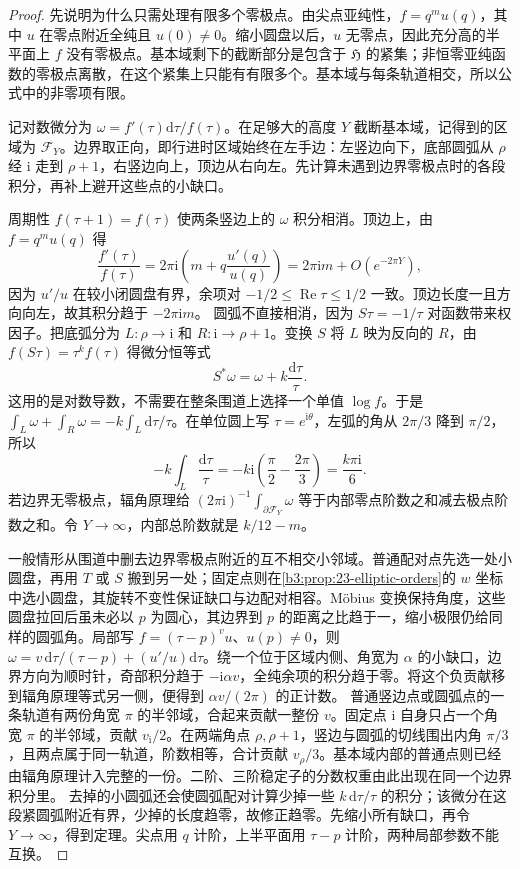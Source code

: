 \begin{proof}
先说明为什么只需处理有限多个零极点。由尖点亚纯性，\(f=q^m u(q)\)，其中 \(u\) 在零点附近全纯且 \(u(0)\ne0\)。缩小圆盘以后，\(u\) 无零点，因此充分高的半平面上 \(f\) 没有零极点。基本域剩下的截断部分是包含于 \(\mathfrak H\) 的紧集；非恒零亚纯函数的零极点离散，在这个紧集上只能有有限多个。基本域与每条轨道相交，所以公式中的非零项有限。

记对数微分为 \(\omega=f'(\tau)\mathrm{d}\tau/f(\tau)\)。在足够大的高度 \(Y\) 截断基本域，记得到的区域为 \(\mathcal F_Y\)。边界取正向，即行进时区域始终在左手边：左竖边向下，底部圆弧从 \(\rho\) 经 \(\mathrm{i}\) 走到 \(\rho+1\)，右竖边向上，顶边从右向左。先计算未遇到边界零极点时的各段积分，再补上避开这些点的小缺口。

周期性 \(f(\tau+1)=f(\tau)\) 使两条竖边上的 \(\omega\) 积分相消。顶边上，由 \(f=q^m u(q)\) 得
\[
 \frac{f'(\tau)}{f(\tau)}
 =2\pi\mathrm{i}\left(m+q\frac{u'(q)}{u(q)}\right)
 =2\pi\mathrm{i}m+O(e^{-2\pi Y}),
\]
因为 \(u'/u\) 在较小闭圆盘有界，余项对 \(-1/2\le\operatorname{Re}\tau\le1/2\) 一致。顶边长度一且方向向左，故其积分趋于 \(-2\pi\mathrm{i}m\)。
圆弧不直接相消，因为 \(S\tau=-1/\tau\) 对函数带来权因子。把底弧分为 \(L:\rho\to\mathrm{i}\) 和 \(R:\mathrm{i}\to\rho+1\)。变换 \(S\) 将 \(L\) 映为反向的 \(R\)，由 \(f(S\tau)=\tau^kf(\tau)\) 得微分恒等式
\[
 S^*\omega=\omega+k\frac{\mathrm{d}\tau}{\tau}.
\]
这用的是对数导数，不需要在整条围道上选择一个单值 \(\log f\)。于是
\(\int_L\omega+\int_R\omega=-k\int_L\mathrm{d}\tau/\tau\)。在单位圆上写 \(\tau=e^{\mathrm{i}\theta}\)，左弧的角从 \(2\pi/3\) 降到 \(\pi/2\)，所以
\[
 -k\int_L\frac{\mathrm{d}\tau}{\tau}
 =-k\mathrm{i}\left(\frac\pi2-\frac{2\pi}3\right)
 =\frac{k\pi\mathrm{i}}6.
\]
若边界无零极点，辐角原理给 \((2\pi\mathrm{i})^{-1}\int_{\partial\mathcal F_Y}\omega\) 等于内部零点阶数之和减去极点阶数之和。令 \(Y\to\infty\)，内部总阶数就是 \(k/12-m\)。

一般情形从围道中删去边界零极点附近的互不相交小邻域。普通配对点先选一处小圆盘，再用 \(T\) 或 \(S\) 搬到另一处；固定点则在\cref{b3:prop:23-elliptic-orders}的 \(w\) 坐标中选小圆盘，其旋转不变性保证缺口与边配对相容。Möbius 变换保持角度，这些圆盘拉回后虽未必以 \(p\) 为圆心，其边界到 \(p\) 的距离之比趋于一，缩小极限仍给同样的圆弧角。局部写 \(f=(\tau-p)^v u\)、\(u(p)\ne0\)，则
\(\omega=v\,\mathrm{d}\tau/(\tau-p)+(u'/u)\mathrm{d}\tau\)。绕一个位于区域内侧、角宽为 \(\alpha\) 的小缺口，边界方向为顺时针，奇部积分趋于 \(-\mathrm{i}\alpha v\)，全纯余项的积分趋于零。将这个负贡献移到辐角原理等式另一侧，便得到 \(\alpha v/(2\pi)\) 的正计数。
普通竖边点或圆弧点的一条轨道有两份角宽 \(\pi\) 的半邻域，合起来贡献一整份 \(v\)。固定点 \(\mathrm{i}\) 自身只占一个角宽 \(\pi\) 的半邻域，贡献 \(v_{\mathrm{i}}/2\)。在两端角点 \(\rho,\rho+1\)，竖边与圆弧的切线围出内角 \(\pi/3\)，且两点属于同一轨道，阶数相等，合计贡献 \(v_\rho/3\)。基本域内部的普通点则已经由辐角原理计入完整的一份。二阶、三阶稳定子的分数权重由此出现在同一个边界积分里。
去掉的小圆弧还会使圆弧配对计算少掉一些 \(k\,\mathrm{d}\tau/\tau\) 的积分；该微分在这段紧圆弧附近有界，少掉的长度趋零，故修正趋零。先缩小所有缺口，再令 \(Y\to\infty\)，得到定理。尖点用 \(q\) 计阶，上半平面用 \(\tau-p\) 计阶，两种局部参数不能互换。
\end{proof}
